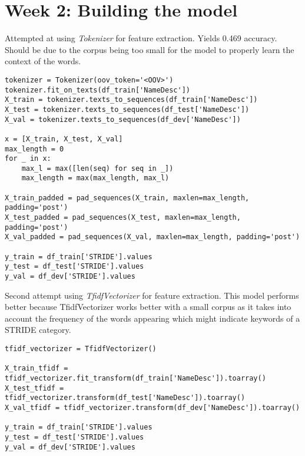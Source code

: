 \section*{Week 2: Building the model}

Attempted at using \textit{Tokenizer} for feature extraction. Yields 0.469 accuracy. Should be due to the corpus being too small for the model to properly learn the context of the words.
\begin{lstlisting}[frame=single]
tokenizer = Tokenizer(oov_token='<OOV>')
tokenizer.fit_on_texts(df_train['NameDesc'])
X_train = tokenizer.texts_to_sequences(df_train['NameDesc'])
X_test = tokenizer.texts_to_sequences(df_test['NameDesc'])
X_val = tokenizer.texts_to_sequences(df_dev['NameDesc'])

x = [X_train, X_test, X_val]
max_length = 0
for _ in x:
    max_l = max([len(seq) for seq in _])
    max_length = max(max_length, max_l)

X_train_padded = pad_sequences(X_train, maxlen=max_length, padding='post')
X_test_padded = pad_sequences(X_test, maxlen=max_length, padding='post')
X_val_padded = pad_sequences(X_val, maxlen=max_length, padding='post')

y_train = df_train['STRIDE'].values
y_test = df_test['STRIDE'].values
y_val = df_dev['STRIDE'].values
\end{lstlisting}

Second attempt using \textit{TfidfVectorizer} for feature extraction. This model performs better because TfidfVectorizer works better with a small corpus as it takes into account the frequency of the words appearing which might indicate keywords of a STRIDE category.
\begin{lstlisting}[frame=single]
tfidf_vectorizer = TfidfVectorizer()

X_train_tfidf = tfidf_vectorizer.fit_transform(df_train['NameDesc']).toarray()
X_test_tfidf = tfidf_vectorizer.transform(df_test['NameDesc']).toarray()
X_val_tfidf = tfidf_vectorizer.transform(df_dev['NameDesc']).toarray()

y_train = df_train['STRIDE'].values
y_test = df_test['STRIDE'].values
y_val = df_dev['STRIDE'].values
\end{lstlisting}

